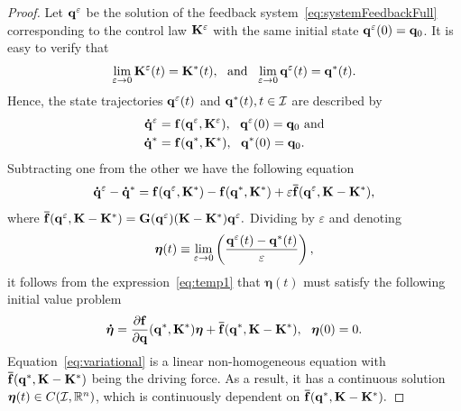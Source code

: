 \documentclass[
12pt,draftcls,onecolumn%
]{IEEEtran}
\begin{document}
\begin{proof}
Let ${\bf q}^{\varepsilon}$ be the solution of the feedback system~\eqref{eq:systemFeedbackFull} corresponding to the control law ${\bf K}^{\varepsilon}$ with the same initial state ${\bf q}^{\varepsilon}(0)={\bf q}_0$. It is easy to verify that
%
\begin{align*}
  \lim_{\varepsilon\to 0} {\bf K}^{\varepsilon}(t) = {\bf K}^*(t),~~\text{and}~~
  \lim_{\varepsilon\to 0} {\bf q}^{\varepsilon}(t) = {\bf q}^*(t).
\end{align*}
% 
Hence, the state trajectories ${\bf q}^{\varepsilon}(t)$ and ${\bf q}^*(t),t\in {\cal I}$  are described by
%
\begin{equation*}
\begin{split}
{\bf \dot q}^\varepsilon &= {\bf f}({\bf q}^\varepsilon,{\bf K}^\varepsilon),~~{\bf q}^\varepsilon(0) = {\bf q}_0~\text{and}\\
{\bf \dot q^*} &= {\bf f}({\bf q}^*,{\bf K}^*),~~{\bf q}^*(0) = {\bf q}_0.
\end{split}
\end{equation*}
%
Subtracting one from the other we have the following equation
\begin{equation}
{\bf \dot q}^\varepsilon - {\bf \dot q}^* = {\bf f} ({\bf q}^\varepsilon,{\bf K}^*) - {\bf f} ({\bf q}^*,{\bf K}^*) + \varepsilon {\bf \bar f} ({\bf q}^\varepsilon,{\bf K}-{\bf K}^*),
\label{eq:temp1}
\end{equation}
where ${\bf \bar f} ({\bf q}^\varepsilon,{\bf K}-{\bf K}^*) = {\bf G}({\bf q}^{\varepsilon})({\bf K} - {\bf K}^*){\bf q}^\varepsilon.$ 
Dividing by $\varepsilon$ and denoting
\begin{equation*}
\boldsymbol{\eta} (t)\equiv \lim_{\varepsilon\to 0}\left(\frac{{\bf q}^{\varepsilon}(t)-{\bf q}^*(t)}{\varepsilon}\right),
\end{equation*}
it follows from the expression~\eqref{eq:temp1} that $\boldsymbol{\eta}(t)$ must satisfy the following initial value problem
\begin{equation}
\begin{split}
\boldsymbol{\dot\eta} = \frac{\partial {\bf f}}{\partial{\bf q}}({\bf q}^*,{\bf K}^*)\boldsymbol{\eta} + {\bf \bar{f}}({\bf q}^*,{\bf K}-{\bf K}^*),~~\boldsymbol{\eta}(0)  = 0.
\end{split}
\label{eq:variational}
\end{equation}
Equation~\eqref{eq:variational} is a linear non-homogeneous equation with ${\bf \bar{f}}({\bf q}^*,{\bf K}-{\bf K}^*)$ being the driving force. As a result, it has a continuous solution $\boldsymbol{\eta}(t)\in C({\cal I},\mathbb{R}^n)$, which is continuously dependent on ${\bf \bar{f}}({\bf q}^*,{\bf K}-{\bf K}^*).$ 


\end{proof}
\end{document}

